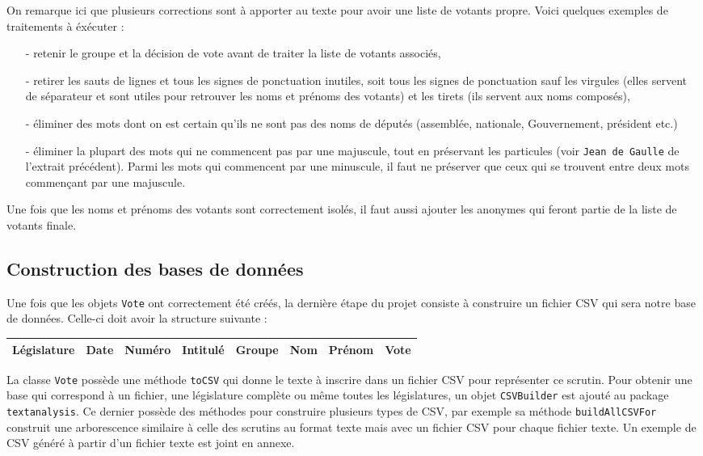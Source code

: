 On remarque ici que plusieurs corrections sont à apporter au texte pour avoir une liste de votants propre. Voici quelques exemples de traitements à éxécuter :
\begin{itemize}
\item[-] retenir le groupe et la décision de vote avant de traiter la liste de votants associés,
\item[-] retirer les sauts de lignes et tous les signes de ponctuation inutiles, soit tous les signes de ponctuation sauf les virgules (elles servent de séparateur et sont utiles pour retrouver les noms et prénoms des votants) et les tirets (ils servent aux noms composés),
\item[-] éliminer des mots dont on est certain qu'ils ne sont pas des noms de députés (assemblée, nationale, Gouvernement, président etc.)
\item[-] éliminer la plupart des mots qui ne commencent pas par une majuscule, tout en préservant les particules (voir \verb|Jean de Gaulle| de l'extrait précédent). Parmi les mots qui commencent par une minuscule, il faut ne préserver que ceux qui se trouvent entre deux mots commençant par une majuscule.
\end{itemize}

\vspace{0.3cm}
Une fois que les noms et prénoms des votants sont correctement isolés, il faut aussi ajouter les anonymes qui feront partie de la liste de votants finale.

\subsection{Construction des bases de données}

Une fois que les objets \verb|Vote| ont correctement été créés, la dernière étape du projet consiste à construire un fichier CSV qui sera notre base de données. Celle-ci doit avoir la structure suivante :

\begin{center}
\begin{tabular}{|c|c|c|c|c|c|c|c|}
\hline
Législature & Date & Numéro & Intitulé & Groupe & Nom & Prénom & Vote \\
\hline
\end{tabular}
\end{center}

La classe \verb|Vote| possède une méthode \verb|toCSV| qui donne le texte à inscrire dans un fichier CSV pour représenter ce scrutin. Pour obtenir une base qui correspond à un fichier, une législature complète ou même toutes les législatures, un objet \verb|CSVBuilder| est ajouté au package \verb|textanalysis|. Ce dernier possède des méthodes pour construire plusieurs types de CSV, par exemple sa méthode \verb|buildAllCSVFor| construit une arborescence similaire à celle des scrutins au format texte mais avec un fichier CSV pour chaque fichier texte.\newline
Un exemple de CSV généré à partir d'un fichier texte est joint en annexe.
